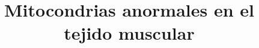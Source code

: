 \documentclass{bmcart}
\begin{document}
	\begin{frontmatter}
	
		\begin{fmbox}
			
			
			\title{Mitocondrias anormales en el tejido muscular}
			
			
			\author[
			  addressref={aff1},                   %
			  corref={aff1},                       %
			  email={juliadelrio2003@uma.es}   %
			]{ } %
			
			\author[
			  addressref={aff1},
			  email={javiimendeezz@uma.es}
			]{ }

			\author[
			  addressref={aff1},
			  email={jesusrus@uma.es}
			]{ }
			
			\author[
			addressref={aff1},
			email={benjitox@uma.es}
			]{ }

			
			\address[id=aff1]{%
			  ,             %
			  ,          %
			  ,                              %
			}
		
		\end{fmbox}%
		
		\begin{abstractbox}
		
			\begin{abstract} %
			
			

\end{abstract}
\end{abstractbox}
\end{frontmatter}
\end{document}
